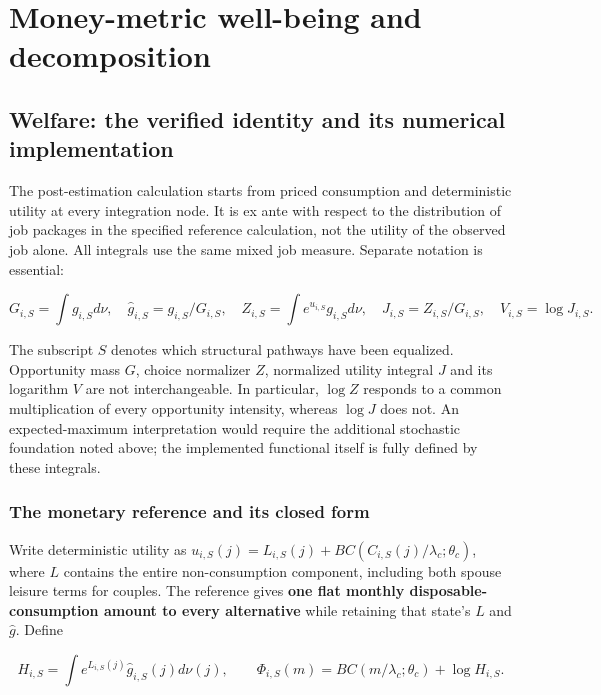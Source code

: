 \documentclass[11pt,a4paper]{article}
\begin{document}
\section{Money-metric well-being and decomposition}\label{money-metric-well-being-and-decomposition}

\subsection{Welfare: the verified identity and its numerical implementation}\label{welfare-the-verified-identity-and-its-numerical-implementation}

The post-estimation calculation starts from priced consumption and deterministic utility at every integration node. It is ex ante with respect to the distribution of job packages in the specified reference calculation, not the utility of the observed job alone. All integrals use the same mixed job measure. Separate notation is essential:

\[G_{i,S}=\int g_{i,S}d\nu,\quad \widehat g_{i,S}=g_{i,S}/G_{i,S},\quad
Z_{i,S}=\int e^{u_{i,S}}g_{i,S}d\nu,\quad J_{i,S}=Z_{i,S}/G_{i,S},\quad V_{i,S}=\log J_{i,S}.\]

The subscript \(S\) denotes which structural pathways have been equalized. Opportunity mass \(G\), choice normalizer \(Z\), normalized utility integral \(J\) and its logarithm \(V\) are not interchangeable. In particular, \(\log Z\) responds to a common multiplication of every opportunity intensity, whereas \(\log J\) does not. An expected-maximum interpretation would require the additional stochastic foundation noted above; the implemented functional itself is fully defined by these integrals.

\subsubsection{The monetary reference and its closed form}\label{the-monetary-reference-and-its-closed-form}

Write deterministic utility as \(u_{i,S}(j)=L_{i,S}(j)+BC(C_{i,S}(j)/\lambda_c;\theta_c)\), where \(L\) contains the entire non-consumption component, including both spouse leisure terms for couples. The reference gives \textbf{one flat monthly disposable-consumption amount to every alternative} while retaining that state's \(L\) and \(\widehat g\). Define

\[H_{i,S}=\int e^{L_{i,S}(j)}\widehat g_{i,S}(j)d\nu(j),\qquad
\Phi_{i,S}(m)=BC(m/\lambda_c;\theta_c)+\log H_{i,S}.\]
\end{document}
